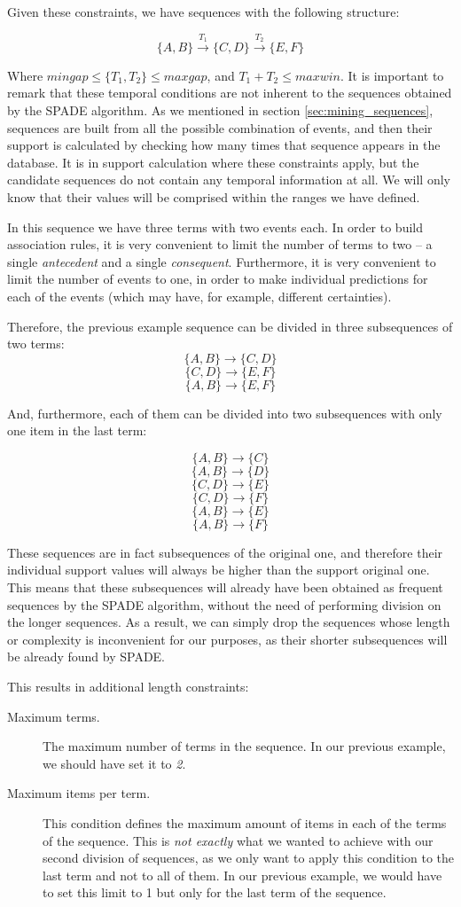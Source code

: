 \documentclass[a4paper,12pt]{article}
\begin{document}
Given these constraints, we have sequences with the following structure:

$$\{A, B\} \xrightarrow{T_1} \{C, D\} \xrightarrow{T_2} \{E, F\}$$

Where $mingap \leq \{T_1, T_2\} \leq maxgap$, and $T_1+T_2 \leq maxwin$. It is important to remark that these temporal conditions are not inherent to the sequences obtained by the SPADE algorithm. As we mentioned in section \ref{sec:mining_sequences}, sequences are built from all the possible combination of events, and then their support is calculated by checking how many times that sequence appears in the database. It is in support calculation where these constraints apply, but the candidate sequences do not contain any temporal information at all. We will only know that their values will be comprised within the ranges we have defined.

In this sequence we have three terms with two events each. In order to build association rules, it is very convenient to limit the number of terms to two -- a single \emph{antecedent} and a single \emph{consequent}. Furthermore, it is very convenient to limit the number of events to one, in order to make individual predictions for each of the events (which may have, for example, different certainties). 

Therefore, the previous example sequence can be divided in three subsequences of two terms:
$$\{A, B\} \longrightarrow \{C, D\}$$
$$\{C, D\} \longrightarrow \{E, F\}$$
$$\{A, B\} \longrightarrow \{E, F\}$$

And, furthermore, each of them can be divided into two subsequences with only one item in the last term:

$$\{A, B\} \longrightarrow \{C\}$$
$$\{A, B\} \longrightarrow \{D\}$$
$$\{C, D\} \longrightarrow \{E\}$$
$$\{C, D\} \longrightarrow \{F\}$$
$$\{A, B\} \longrightarrow \{E\}$$
$$\{A, B\} \longrightarrow \{F\}$$

These sequences are in fact subsequences of the original one, and therefore their individual support values will always be higher than the support original one. This means that these subsequences will already have been obtained as frequent sequences by the SPADE algorithm, without the need of performing division on the longer sequences. As a result, we can simply drop the sequences whose length or complexity is inconvenient for our purposes, as their shorter subsequences will be already found by SPADE.

This results in additional length constraints:
\begin{description}
\item[Maximum terms.] The maximum number of terms in the sequence. In our previous example, we should have set it to \emph{2}.
\item[Maximum items per term.] This condition defines the maximum amount of items in each of the terms of the sequence. This is \emph{not exactly} what we wanted to achieve with our second division of sequences, as we only want to apply this condition to the last term and not to all of them. In our previous example, we would have to set this limit to 1 but only for the last term of the sequence.
\end{description}
\end{document}
